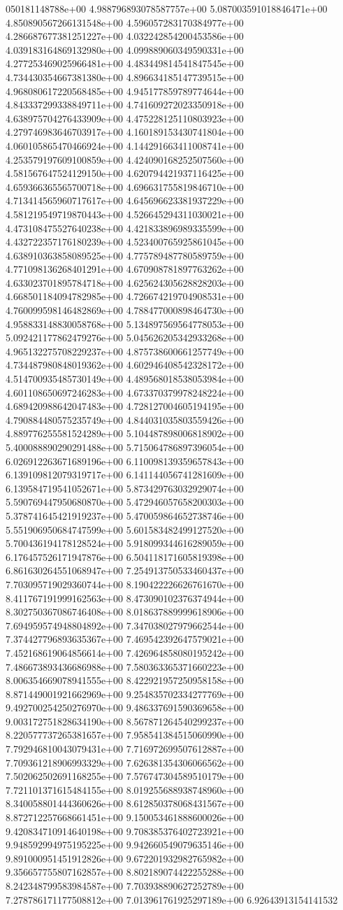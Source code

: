 050181148788e+00	4.988796893078587757e+00	5.087003591018846471e+00	4.850890567266131548e+00	4.596057283170384977e+00	4.286687677381251227e+00	4.032242854200453586e+00	4.039183164869132980e+00	4.099889060349590331e+00	4.277253469025966481e+00	4.483449814541847545e+00	4.734430354667381380e+00	4.896634185147739515e+00	4.968080617220568485e+00	4.945177859789774644e+00	4.843337299338849711e+00	4.741609272023350918e+00	4.638975704276433909e+00	4.475228125110803923e+00	4.279746983646703917e+00	4.160189153430741804e+00	4.060105865470466924e+00	4.144291663411008741e+00	4.253579197609100859e+00	4.424090168252507560e+00	4.581567647524129150e+00	4.620794421937116425e+00	4.659366365565700718e+00	4.696631755819846710e+00	4.713414565960717617e+00	4.645696623381937229e+00	4.581219549719870443e+00	4.526645294311030021e+00	4.473108475527640238e+00	4.421833896989335599e+00	4.432722357176180239e+00	4.523400765925861045e+00	4.638910363858089525e+00	4.775789487780589759e+00	4.771098136268401291e+00	4.670908781897763262e+00	4.633023701895784718e+00	4.625624305628828203e+00	4.668501184094782985e+00	4.726674219704908531e+00	4.760099598146482869e+00	4.788477000898464730e+00	4.958833148830058768e+00	5.134897569564778053e+00	5.092421177862479276e+00	5.045626205342933268e+00	4.965132275708229237e+00	4.875738600661257749e+00	4.734487980848019362e+00	4.602946408542328172e+00	4.514700935485730149e+00	4.489568018538053984e+00	4.601108650697246283e+00	4.673370379978248224e+00	4.689420988642047483e+00	4.728127004605194195e+00	4.790884480575235749e+00	4.844031035803559426e+00	4.889776255581524289e+00	5.104487898006818902e+00	5.400088890290291488e+00	5.715064786897396054e+00	6.026912263671689196e+00	6.110098139359657843e+00	6.139109812079319717e+00	6.141144056741281609e+00	6.139584719541052671e+00	5.873429763032929074e+00	5.590769447950680870e+00	5.472946057658200303e+00	5.378741645421919237e+00	5.470059864652738746e+00	5.551906950684747599e+00	5.601583482499127520e+00	5.700436194178128524e+00	5.918099344616289059e+00	6.176457526171947876e+00	6.504118171605819398e+00	6.861630264551068947e+00	7.254913750533460437e+00	7.703095719029360744e+00	8.190422226626761670e+00	8.411767191999162563e+00	8.473090102376374944e+00	8.302750367086746408e+00	8.018637889999618906e+00	7.694959574948804892e+00	7.347038027979662544e+00	7.374427796893635367e+00	7.469542392647579021e+00	7.452168619064856614e+00	7.426964858080195242e+00	7.486673893436686988e+00	7.580363365371660223e+00	8.006354669078941555e+00	8.422921957250958158e+00	8.871449001921662969e+00	9.254835702334277769e+00	9.492700254250276970e+00	9.486337691590369658e+00	9.003172751828634190e+00	8.567871264540299237e+00	8.220577737265381657e+00	7.958541384515060990e+00	7.792946810043079431e+00	7.716972699507612887e+00	7.709361218906993329e+00	7.626381354306066562e+00	7.502062502691168255e+00	7.576747304589510179e+00	7.721101371615484155e+00	8.019255688938748960e+00	8.340058801444360626e+00	8.612850378068431567e+00	8.872712257668661451e+00	9.150053461888600026e+00	9.420834710914640198e+00	9.708385376402723921e+00	9.948592994975195225e+00	9.942660549079635146e+00	9.891000951451912826e+00	9.672201932982765982e+00	9.356657755807162857e+00	8.802189074422255288e+00	8.242348799583984587e+00	7.703938890627252789e+00	7.278786171177508812e+00	7.013961761925297189e+00	6.92643913154141532